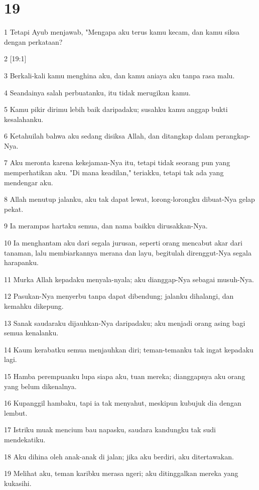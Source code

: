\chapter{19}

\par 1 Tetapi Ayub menjawab, "Mengapa aku terus kamu kecam, dan kamu siksa dengan perkataan?
\par 2 [19:1]
\par 3 Berkali-kali kamu menghina aku, dan kamu aniaya aku tanpa rasa malu.
\par 4 Seandainya salah perbuatanku, itu tidak merugikan kamu.
\par 5 Kamu pikir dirimu lebih baik daripadaku; susahku kamu anggap bukti kesalahanku.
\par 6 Ketahuilah bahwa aku sedang disiksa Allah, dan ditangkap dalam perangkap-Nya.
\par 7 Aku meronta karena kekejaman-Nya itu, tetapi tidak seorang pun yang memperhatikan aku. "Di mana keadilan," teriakku, tetapi tak ada yang mendengar aku.
\par 8 Allah menutup jalanku, aku tak dapat lewat, lorong-lorongku dibuat-Nya gelap pekat.
\par 9 Ia merampas hartaku semua, dan nama baikku dirusakkan-Nya.
\par 10 Ia menghantam aku dari segala jurusan, seperti orang mencabut akar dari tanaman, lalu membiarkannya merana dan layu, begitulah direnggut-Nya segala harapanku.
\par 11 Murka Allah kepadaku menyala-nyala; aku dianggap-Nya sebagai musuh-Nya.
\par 12 Pasukan-Nya menyerbu tanpa dapat dibendung; jalanku dihalangi, dan kemahku dikepung.
\par 13 Sanak saudaraku dijauhkan-Nya daripadaku; aku menjadi orang asing bagi semua kenalanku.
\par 14 Kaum kerabatku semua menjauhkan diri; teman-temanku tak ingat kepadaku lagi.
\par 15 Hamba perempuanku lupa siapa aku, tuan mereka; dianggapnya aku orang yang belum dikenalnya.
\par 16 Kupanggil hambaku, tapi ia tak menyahut, meskipun kubujuk dia dengan lembut.
\par 17 Istriku muak mencium bau napasku, saudara kandungku tak sudi mendekatiku.
\par 18 Aku dihina oleh anak-anak di jalan; jika aku berdiri, aku ditertawakan.
\par 19 Melihat aku, teman karibku merasa ngeri; aku ditinggalkan mereka yang kukasihi.
